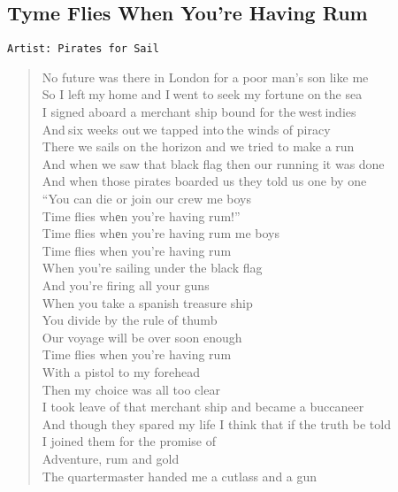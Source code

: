 \documentclass[11pt]{article}
\begin{document}
\subsection{Tyme Flies When You're Having Rum}
\label{sec:org3f1ad6c}
\begin{verbatim}
Artist: Pirates for Sail
\end{verbatim}
\begin{verse}
No future was there in London for a poor man's son like me\\
So I left my home and I went to seek my fortune on the sea\\
I signed aboard a merchant ship bound for the west indies\\
And six weeks out we tapped into the winds of piracy\\
\vspace*{1em}
There we sails on the horizon and we tried to make a run\\
And when we saw that black flag then our running it was done\\
And when those pirates boarded us they told us one by one\\
``You can die or join our crew me boys\\
Time flies whеn you're having rum!''\\
Time flies whеn you're having rum me boys\\
Time flies when you're having rum\\
When you're sailing under the black flag\\
And you're firing all your guns\\
When you take a spanish treasure ship\\
You divide by the rule of thumb\\
Our voyage will be over soon enough\\
Time flies when you're having rum\\
\vspace*{1em}
With a pistol to my forehead\\
Then my choice was all too clear\\
I took leave of that merchant ship and became a buccaneer\\
And though they spared my life I think that if the truth be told\\
I joined them for the promise of\\
Adventure, rum and gold\\
\vspace*{1em}
The quartermaster handed me a cutlass and a gun\\

\end{verse}
\end{document}
